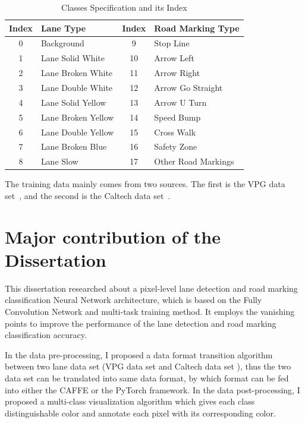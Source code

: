 \begin{spacing}{1.5}
\begin{table}[ht]
\centering
\caption{Classes Specification and its Index}
\label{tab:classes}
\begin{tabular}{clcl}
\hline
Index & Lane Type          & Index & Road Marking Type   \\ \hline
0     & Background         & 9     & Stop Line           \\
1     & Lane Solid White   & 10    & Arrow Left          \\
2     & Lane Broken White  & 11    & Arrow Right         \\
3     & Lane Double White  & 12    & Arrow Go Straight   \\
4     & Lane Solid Yellow  & 13    & Arrow U Turn        \\
5     & Lane Broken Yellow & 14    & Speed Bump          \\
6     & Lane Double Yellow & 15    & Cross Walk          \\
7     & Lane Broken Blue   & 16    & Safety Zone         \\
8     & Lane Slow          & 17    & Other Road Markings \\ \hline
\end{tabular}
\end{table}%

The training data mainly comes from two sources. The first is the VPG data set~\cite{lee2017vpgnet}, and the second is the Caltech data set~\cite{aly2008real}.

\section{Major contribution of the Dissertation}
\label{sec:IN_contribution}

This dissertation researched about a pixel-level lane detection and road marking classification Neural Network architecture, which is based on the Fully Convolution Network and multi-task training method. It employs the vanishing points to improve the performance of the lane detection and road marking classification accuracy.

In the data pre-processing, I proposed a data format transition algorithm between two lane data set (VPG data set \cite{lee2017vpgnet} and Caltech data set \cite{aly2008real}), thus the two data set can be translated into same data format, by which format can be fed into either the CAFFE or the PyTorch framework. In the data post-processing, I proposed a multi-class visualization algorithm which gives each class distinguishable color and annotate each pixel with its corresponding color.


\end{spacing}
